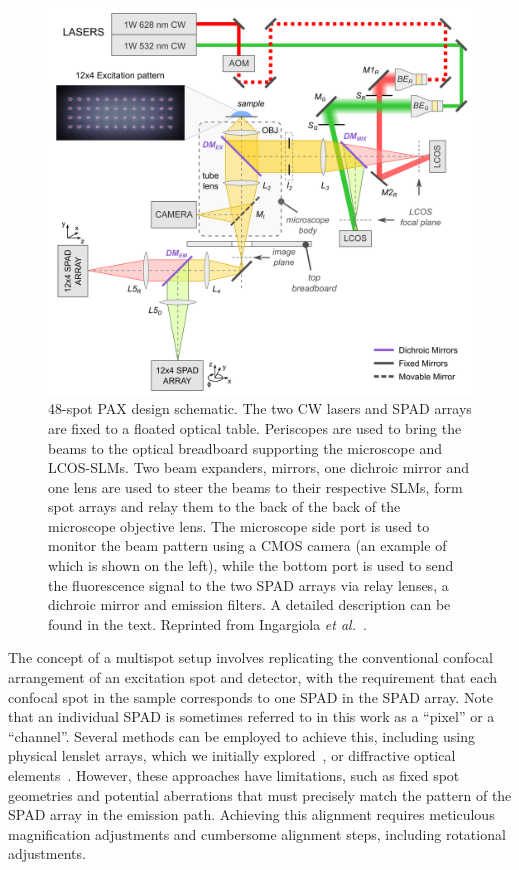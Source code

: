 \begin{figure}
\centering
\includegraphics[width=0.7\linewidth]{chapters/figures/design_multispot_LCOS_camera_SPAD.png}
\caption{\label{fig:setup} 48-spot PAX design schematic. 
The two \ac{CW} lasers and \ac{SPAD} arrays are fixed to a floated optical table. 
Periscopes are used to bring the beams to the optical breadboard supporting the microscope and \ac{LCOS-SLM}s. 
Two beam expanders, mirrors, one dichroic mirror and one lens are used to steer the beams to their respective SLMs, form spot arrays and relay them to the back of the back of the microscope objective lens.
The microscope side port is used to monitor the beam pattern using a \ac{CMOS} camera (an example of which is shown on the left), while the bottom port is used to send the fluorescence signal to the two \ac{SPAD} arrays via relay lenses, a dichroic mirror and emission filters. 
A detailed description can be found in the text.
Reprinted from Ingargiola \textit{et al.}~\cite{ingargiola_JCP_2018}.}
\end{figure}

The concept of a multispot setup involves replicating the conventional confocal arrangement of an excitation spot and detector, with the requirement that each confocal spot in the sample corresponds to one \ac{SPAD} in the \ac{SPAD} array. 
Note that an individual \ac{SPAD} is sometimes referred to in this work as a \enquote{pixel} or a \enquote{channel}.
Several methods can be employed to achieve this, including using physical lenslet arrays, which we initially explored~\cite{colyer_SPIE_2010}, or diffractive optical elements~\cite{gosh_JBO_2005, krmpot_SPIE_2015}. 
However, these approaches have limitations, such as fixed spot geometries and potential aberrations that must precisely match the pattern of the \ac{SPAD} array in the emission path. 
Achieving this alignment requires meticulous magnification adjustments and cumbersome alignment steps, including rotational adjustments.


